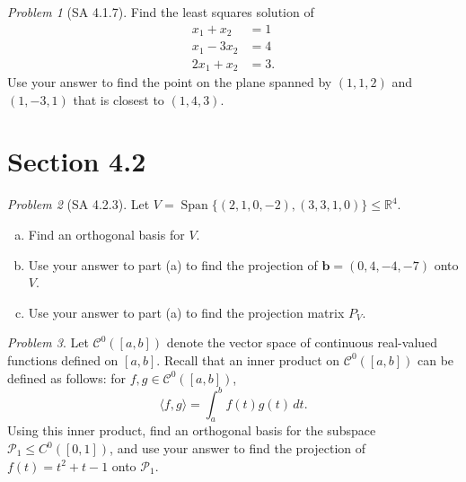 \documentclass[11pt]{paper}
\theoremstyle{remark}
\newtheorem{problem}{Problem}
\newtheorem*{solution}{{\bf Solution}}
\newcommand\R{\fld{R}}
\renewcommand{\vec}[1]{\mathbf{#1}}
\newcommand{\<}{\ensuremath{\langle}}
\renewcommand{\>}{\ensuremath{\rangle}}
\newcommand\fld[1]{\ensuremath{\mathbb{#1}}}
\newcommand\vb{\vec{b}}
\newcommand\Span{\ensuremath{\operatorname{Span}}}
\begin{document}
\newpage


\begin{problem}[SA 4.1.7]
Find the least squares solution of
\begin{align*}
x_1 +x_2 &= 1\\
x_1 - 3x_2 &= 4\\
2x_1 +x_2 &= 3.
\end{align*}
Use your answer to find the point on the plane spanned by $(1, 1, 2)$ and 
$(1, -3, 1)$ that is closest to $(1, 4, 3)$. 
\end{problem}


\newpage
\section*{Section 4.2}
\begin{problem}[SA 4.2.3]
Let $V = \Span \{(2, 1, 0, -2), (3, 3, 1, 0)\}\leq \R^4$.
\begin{enumerate}[(a)]
\item 
Find an orthogonal basis for $V$.
\item Use your answer to part (a) to find the projection of 
  $\vb = (0, 4, -4, -7)$ onto $V$.
\item Use your answer to part (a) to find the projection matrix $P_V$.
\end{enumerate}
\end{problem}

\newpage

\begin{problem}
Let $\mathcal{C}^0([a, b])$ denote the vector space of continuous real-valued
functions defined on $[a,b]$. Recall that an inner product on 
$\mathcal{C}^0([a, b])$ can be defined as follows: 
for $f, g \in \mathcal{C}^0([a, b])$,
\[
\<f, g\> =
\int^b_a f(t)g(t)\, dt.
\]
Using this inner product, find an orthogonal basis for the 
subspace $\mathcal{P}_1 \leq C^0([0, 1])$,
and use your answer to find the projection
of $f(t) = t^2 + t - 1$ onto $\mathcal{P}_1$.
\end{problem}
\end{document}
